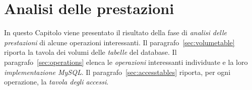 \chapter{Analisi delle prestazioni}
In questo Capitolo viene presentato il risultato della fase di {\it analisi delle prestazioni} di
alcune operazioni interessanti. Il paragrafo~\vref{sec:volumetable} riporta la tavola dei
volumi delle {\it tabelle} del database. Il paragrafo~\vref{sec:operations} elenca
le {\it operazioni} interessanti individuate e la loro {\it implementazione MySQL}. Il
paragrafo~\vref{sec:accesstables} riporta, per ogni operazione, la {\it tavola degli accessi}.



